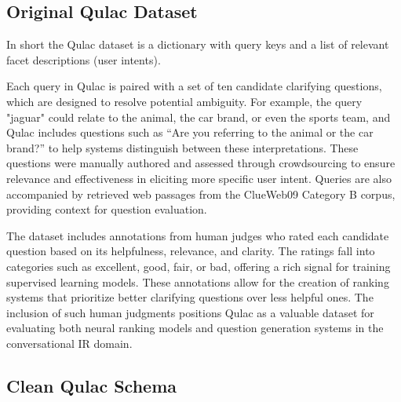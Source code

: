 \documentclass[11pt]{article}
\begin{document}
\subsection{Original Qulac Dataset}
In short the Qulac dataset is a dictionary with query keys and a list of relevant facet descriptions (user intents).

Each query in Qulac is paired with a set of ten candidate clarifying questions, which are designed to resolve potential ambiguity. For example, the query "jaguar" could relate to the animal, the car brand, or even the sports team, and Qulac includes questions such as “Are you referring to the animal or the car brand?” to help systems distinguish between these interpretations. These questions were manually authored and assessed through crowdsourcing to ensure relevance and effectiveness in eliciting more specific user intent. Queries are also accompanied by retrieved web passages from the ClueWeb09 Category B corpus, providing context for question evaluation.

The dataset includes annotations from human judges who rated each candidate question based on its helpfulness, relevance, and clarity. The ratings fall into categories such as excellent, good, fair, or bad, offering a rich signal for training supervised learning models. These annotations allow for the creation of ranking systems that prioritize better clarifying questions over less helpful ones. The inclusion of such human judgments positions Qulac as a valuable dataset for evaluating both neural ranking models and question generation systems in the conversational IR domain.

\subsection{Clean Qulac Schema}
\renewcommand{\arraystretch}{1.2} %
\end{document}
